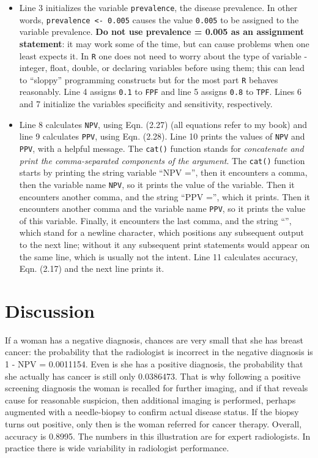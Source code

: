 \documentclass[
]{book}
\begin{document}
\begin{itemize}
\item
  Line 3 initializes the variable \texttt{prevalence}, the disease prevalence. In other words, \texttt{prevalence\ \textless{}-\ 0.005} causes the value \texttt{0.005} to be assigned to the variable prevalence. \textbf{Do not use prevalence = 0.005 as an assignment statement}: it may work some of the time, but can cause problems when one least expects it. In \texttt{R} one does not need to worry about the type of variable - integer, float, double, or declaring variables before using them; this can lead to ``sloppy'' programming constructs but for the most part \texttt{R} behaves reasonably. Line 4 assigns \texttt{0.1} to \texttt{FPF} and line 5 assigns \texttt{0.8} to \texttt{TPF}. Lines 6 and 7 initialize the variables specificity and sensitivity, respectively.
\item
  Line 8 calculates \texttt{NPV}, using Eqn. (2.27) (all equations refer to my book) and line 9 calculates \texttt{PPV}, using Eqn. (2.28). Line 10 prints the values of \texttt{NPV} and \texttt{PPV}, with a helpful message. The \texttt{cat()} function stands for \emph{concatenate and print the comma-separated components of the argument}. The \texttt{cat()} function starts by printing the string variable ``NPV ='', then it encounters a comma, then the variable name \texttt{NPV}, so it prints the value of the variable. Then it encounters another comma, and the string ``PPV ='', which it prints. Then it encounters another comma and the variable name \texttt{PPV}, so it prints the value of this variable. Finally, it encounters the last comma, and the string ``\n'', which stand for a newline character, which positions any subsequent output to the next line; without it any subsequent print statements would appear on the same line, which is usually not the intent. Line 11 calculates accuracy, Eqn. (2.17) and the next line prints it.
\end{itemize}

\hypertarget{discussion}{%
\section{Discussion}\label{discussion}}

If a woman has a negative diagnosis, chances are very small that she has breast cancer: the probability that the radiologist is incorrect in the negative diagnosis is 1 - NPV = 0.0011154. Even is she has a positive diagnosis, the probability that she actually has cancer is still only 0.0386473. That is why following a positive screening diagnosis the woman is recalled for further imaging, and if that reveals cause for reasonable suspicion, then additional imaging is performed, perhaps augmented with a needle-biopsy to confirm actual disease status. If the biopsy turns out positive, only then is the woman referred for cancer therapy. Overall, accuracy is 0.8995. The numbers in this illustration are for expert radiologists. In practice there is wide variability in radiologist performance.
\end{document}
